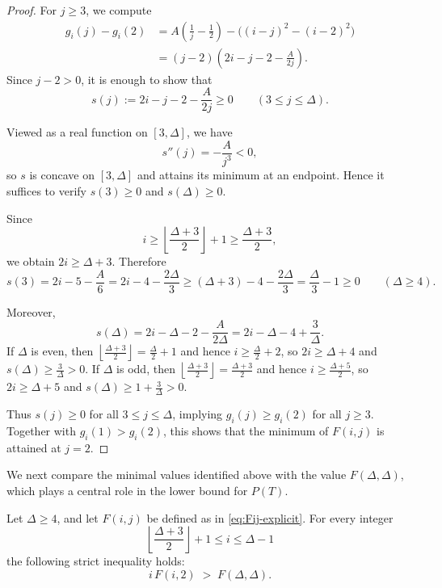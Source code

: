 \documentclass[preprint,12pt]{elsarticle}
\begin{document}
\begin{proof}
For $j\ge 3$, we compute
\begin{align*}
g_i(j)-g_i(2)
&=A\left(\frac{1}{j}-\frac12\right)
   -\bigl((i-j)^2-(i-2)^2\bigr)\\
&=(j-2)\left(2i-j-2-\frac{A}{2j}\right).
\end{align*}
Since $j-2>0$, it is enough to show that
\[
s(j):=2i-j-2-\frac{A}{2j}\ge 0
\qquad (3\le j\le \Delta).
\]

Viewed as a real function on $[3,\Delta]$, we have
\[
s''(j)=-\frac{A}{j^3}<0,
\]
so $s$ is concave on $[3,\Delta]$ and attains its minimum at an endpoint.
Hence it suffices to verify $s(3)\ge 0$ and $s(\Delta)\ge 0$.

Since
\[
i\ge \left\lfloor \frac{\Delta+3}{2}\right\rfloor+1
\ge \frac{\Delta+3}{2},
\]
we obtain $2i\ge \Delta+3$.
Therefore
\[
s(3)=2i-5-\frac{A}{6}
=2i-4-\frac{2\Delta}{3}
\ge (\Delta+3)-4-\frac{2\Delta}{3}
=\frac{\Delta}{3}-1\ge 0
\qquad (\Delta\ge 4).
\]

Moreover,
\[
s(\Delta)=2i-\Delta-2-\frac{A}{2\Delta}
=2i-\Delta-4+\frac{3}{\Delta}.
\]
If $\Delta$ is even, then
$\left\lfloor\frac{\Delta+3}{2}\right\rfloor=\frac{\Delta}{2}+1$
and hence $i\ge \frac{\Delta}{2}+2$, so $2i\ge \Delta+4$ and
$s(\Delta)\ge \frac{3}{\Delta}>0$.
If $\Delta$ is odd, then
$\left\lfloor\frac{\Delta+3}{2}\right\rfloor=\frac{\Delta+3}{2}$
and hence $i\ge \frac{\Delta+5}{2}$, so $2i\ge \Delta+5$ and
$s(\Delta)\ge 1+\frac{3}{\Delta}>0$.

Thus $s(j)\ge 0$ for all $3\le j\le \Delta$, implying
$g_i(j)\ge g_i(2)$ for all $j\ge 3$.
Together with $g_i(1)>g_i(2)$, this shows that the minimum of $F(i,j)$
is attained at $j=2$.
\end{proof}



We next compare the minimal values identified above with the value
$F(\Delta,\Delta)$, which plays a central role in the lower bound for $P(T)$.












\begin{lemma}
\label{lem:iF-i2-dominates-DD}
Let $\Delta\ge 4$, and let $F(i,j)$ be defined as in
\eqref{eq:Fij-explicit}.  
For every integer
\[
\left\lfloor \frac{\Delta+3}{2} \right\rfloor + 1 \le i \le \Delta-1
\]
the following strict inequality holds:
\[
i\,F(i,2) \;>\; F(\Delta,\Delta).
\]
\end{lemma}
\end{document}
